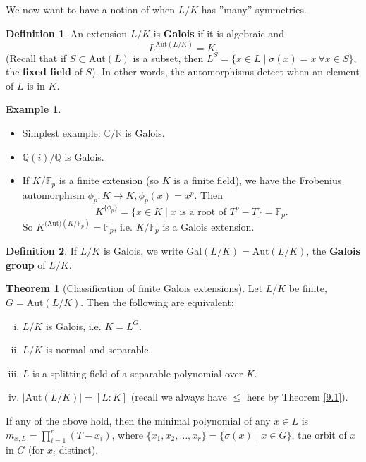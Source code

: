 \documentclass{article}
\theoremstyle{definition}
\newtheorem{theorem}{Theorem}[section]
\newtheorem{example}{Example}[section]
\newtheorem{defn}{Definition}[section]
\begin{document}
We now want to have a notion of when $L/K$ has ''many'' symmetries.
\begin{defn}
    An extension $L/K$ is \textbf{Galois} if it is algebraic and $$L^{\text{Aut}(L/K)}=K.$$ (Recall that if $S \subset \text{Aut}(L)$ is a subset, then $L^S = \{x \in L \mid \sigma(x)=x ~\forall x \in S\}$, the \textbf{fixed field} of $S$). In other words, the automorphisms detect when an element of $L$ is in $K$.
\end{defn}
\begin{example}
    \begin{itemize}
        \item Simplest example: $\mathbb{C}/\mathbb{R}$ is Galois. 
        \item $\mathbb{Q}(i)/\mathbb{Q}$ is Galois.
        \item If $K/\mathbb{F}_p$ is a finite extension (so $K$ is a finite field), we have the Frobenius automorphism $\phi_p : K \to K, \phi_p(x)=x^p$. Then \[
        K^{\{\phi_p\}} = \{x \in K \mid x \text{ is a root of }T^p-T\} = \mathbb{F}_p.
        \]
        So $K^{\text{(Aut)}(K/\mathbb{F}_p)} = \mathbb{F}_p$, i.e. $K/\mathbb{F}_p$ is a Galois extension.
    \end{itemize}
\end{example}
\begin{defn}
    If $L/K$ is Galois, we write $\text{Gal}(L/K) = \text{Aut}(L/K)$, the \textbf{Galois group} of $L/K$.
\end{defn}
\begin{theorem}[Classification of finite Galois extensions]\label{9.2}
    Let $L/K$ be finite, $G = \text{Aut}(L/K)$. Then the following are equivalent:
    \begin{enumerate}[(i)]
        \item $L/K$ is Galois, i.e. $K=L^G$.
        \item $L/K$ is normal and separable.
        \item $L$ is a splitting field of a separable polynomial over $K$.
        \item $|\text{Aut}(L/K)|=[L:K]$ (recall we always have $\le $ here by Theorem \ref{9.1}).
    \end{enumerate}
    If any of the above hold, then the minimal polynomial of any $x \in L$ is $m_{x,L}=\prod_{i=1}^{r} (T-x_i)$, where $\{x_1,x_2,\ldots,x_r\} = \{\sigma(x) \mid  x \in G\}$, the orbit of $x$ in $G$ (for $x_i$ distinct).
\end{theorem}
\end{document}
